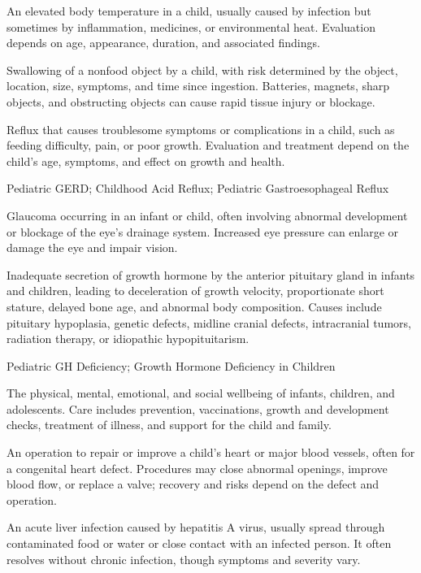  An elevated body temperature in a child, usually caused by infection but sometimes by inflammation,
medicines, or environmental heat. Evaluation depends on age, appearance, duration, and associated findings.

 Swallowing of a nonfood object by a child, with risk determined by the object, location, size, symptoms, and time since ingestion. Batteries, magnets, sharp objects, and obstructing objects can cause rapid tissue injury or blockage.

 Reflux that causes troublesome symptoms or complications in a child, such as feeding difficulty, pain, or poor growth. Evaluation and treatment depend on the child’s age, symptoms, and effect on growth and health.

\synonyms
Pediatric GERD; Childhood Acid Reflux; Pediatric Gastroesophageal Reflux

 Glaucoma occurring in an infant or child, often involving abnormal development or blockage of the eye’s drainage system. Increased eye pressure can enlarge or damage the eye and impair vision.

 Inadequate secretion of growth hormone by the anterior pituitary gland in infants and children, leading to deceleration of growth velocity, proportionate short stature, delayed bone age, and abnormal body composition. Causes include pituitary hypoplasia, genetic defects, midline cranial defects, intracranial tumors, radiation therapy, or idiopathic hypopituitarism.

\synonyms
Pediatric GH Deficiency; Growth Hormone Deficiency in Children

 The physical, mental, emotional, and social wellbeing of infants, children, and adolescents. Care includes prevention, vaccinations, growth and development checks, treatment of illness, and support for the child and family.

 An operation to repair or improve a child's heart or major blood vessels, often for a congenital heart defect. Procedures may close abnormal openings, improve blood flow, or replace a valve; recovery and risks depend on the defect and operation.

 An acute liver infection caused by hepatitis A virus, usually spread through contaminated food or water or close contact with an infected person. It often resolves without chronic infection, though symptoms and severity vary.


